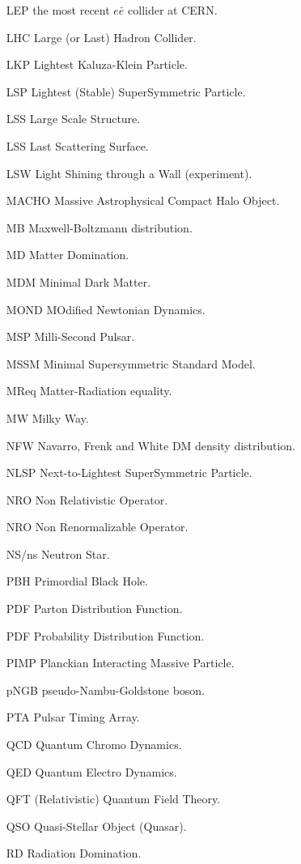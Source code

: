 \begin{multicols}{2}
\begin{itemize}
\item[LEP] the most recent $e\bar{e}$ collider at CERN.
\item[LHC] Large (or Last) Hadron Collider.
\item[LKP] Lightest Kaluza-Klein Particle.
\item[LSP] Lightest (Stable) SuperSymmetric Particle.
\item[LSS] Large Scale Structure.
\item[LSS] Last Scattering Surface.
\item[LSW] Light Shining through a Wall (experiment).
\item[MACHO] Massive Astrophysical Compact Halo Object.
\item[MB] Maxwell-Boltzmann distribution.
\item[MD] Matter Domination. 
\item[MDM] Minimal Dark Matter.
\item[MOND] MOdified Newtonian Dynamics.
\item[MSP] Milli-Second Pulsar.
\item[MSSM] Minimal Supersymmetric Standard Model.
\item[MReq] Matter-Radiation equality. 
\item[MW] Milky Way.
\item[NFW] Navarro, Frenk and White DM density distribution.
\item[NLSP] Next-to-Lightest SuperSymmetric Particle.
\item[NRO] Non Relativistic Operator.
\item[NRO] Non Renormalizable Operator.
\item[NS/ns] Neutron Star.
\item[PBH] Primordial Black Hole.
\item[PDF] Parton Distribution Function.
\item[PDF] Probability Distribution Function.
\item[PIMP] Planckian Interacting Massive Particle.
\item[pNGB] pseudo-Nambu-Goldstone boson.
\item[PTA] Pulsar Timing Array.
\item[QCD] Quantum Chromo Dynamics.
\item[QED] Quantum Electro Dynamics.
\item[QFT] (Relativistic) Quantum Field Theory.
\item[QSO] Quasi-Stellar Object (Quasar).
\item[RD] Radiation Domination.

\end{itemize}
\end{multicols}
